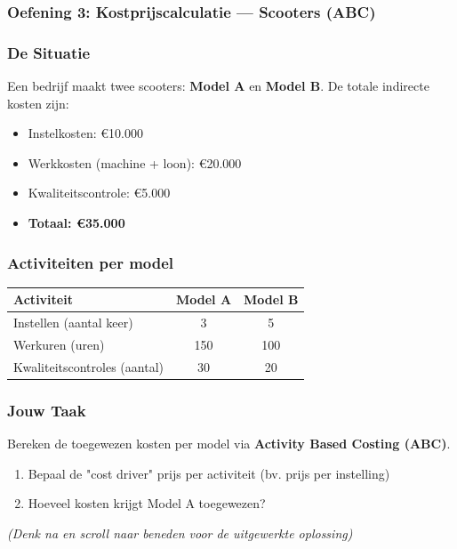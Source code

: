 \documentclass[a4paper,11pt]{article}
\begin{document}
\begin{oefenblok}
    \subsubsection*{Oefening 3: Kostprijscalculatie — Scooters (ABC)}

\subsubsection*{De Situatie}
Een bedrijf maakt twee scooters: \textbf{Model A} en \textbf{Model B}. De totale indirecte kosten zijn:
\begin{itemize}
    \item Instelkosten: €10.000
    \item Werkkosten (machine + loon): €20.000
    \item Kwaliteitscontrole: €5.000
    \item \textbf{Totaal: €35.000}
\end{itemize}

\subsubsection*{Activiteiten per model}
\begin{center}
\begin{tabular}{|l|c|c|}
\hline
\textbf{Activiteit} & \textbf{Model A} & \textbf{Model B} \\
\hline
Instellen (aantal keer) & 3 & 5 \\
\hline
Werkuren (uren) & 150 & 100 \\
\hline
Kwaliteitscontroles (aantal) & 30 & 20 \\
\hline
\end{tabular}
\end{center}

\subsubsection*{Jouw Taak}
Bereken de toegewezen kosten per model via \textbf{Activity Based Costing (ABC)}.
\begin{enumerate}
    \item Bepaal de "cost driver" prijs per activiteit (bv. prijs per instelling)
    \item Hoeveel kosten krijgt Model A toegewezen?
\end{enumerate}

\vspace{0.3cm}
\textit{(Denk na en scroll naar beneden voor de uitgewerkte oplossing)}



\end{oefenblok}
\end{document}
